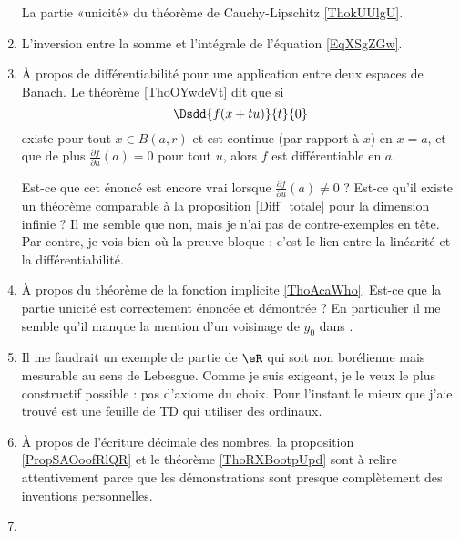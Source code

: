 \begin{enumerate}
        La partie «unicité» du théorème de Cauchy-Lipschitz \ref{ThokUUlgU}.
    \item
        L'inversion entre la somme et l'intégrale de l'équation \eqref{EqXSgZGw}.
    \item   \label{ItemLPrIWZhPg}
        À propos de différentiabilité pour une application entre deux espaces de Banach. Le théorème \ref{ThoOYwdeVt} dit que si
    \begin{equation}
        \Dsdd{ f(x+tu) }{t}{0}
    \end{equation}
    existe pour tout \( x\in B(a,r)\) et est continue (par rapport à \( x\)) en \( x=a\), et que de plus \( \frac{ \partial f }{ \partial u }(a)=0\) pour tout \( u\), alors \( f\) est différentiable en \( a\).

    Est-ce que cet énoncé est encore vrai lorsque \( \frac{ \partial f }{ \partial u }(a)\neq 0\) ? Est-ce qu'il existe un théorème comparable à la proposition \ref{Diff_totale} pour la dimension infinie ? Il me semble que non, mais je n'ai pas de contre-exemples en tête. Par contre, je vois bien où la preuve bloque : c'est le lien entre la linéarité et la différentiabilité.


    \item

        À propos du théorème de la fonction implicite \ref{ThoAcaWho}. Est-ce que la partie unicité est correctement énoncée et démontrée ? En particulier il me semble qu'il manque la mention d'un voisinage de \( y_0\) dans \cite{SNPdukn}.

    \item

        Il me faudrait un exemple de partie de \( \eR\) qui soit non borélienne mais mesurable au sens de Lebesgue. Comme je suis exigeant, je le veux le plus constructif possible : pas d'axiome du choix. Pour l'instant le mieux que j'aie trouvé est une feuille de TD\cite{XSHoosgoQa} qui utiliser des ordinaux.

    \item

        À propos de l'écriture décimale des nombres, la proposition \ref{PropSAOoofRlQR} et le théorème \ref{ThoRXBootpUpd} sont à relire attentivement parce que les démonstrations sont presque complètement des inventions personnelles.

    \item


\end{enumerate}
